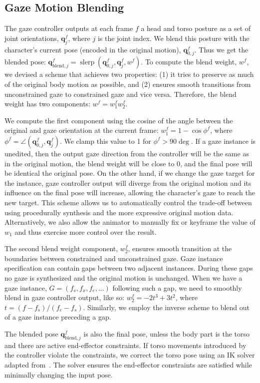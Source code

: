 \subsection{Gaze Motion Blending}
\label{sec:GazeMotionBlending}

The gaze controller outputs at each frame $f$ a head and torso posture as a set of joint orientations, $\mathbf{q}_j^f$, where $j$ is the joint index. We blend this posture with the character's current pose (encoded in the original motion), $\mathbf{q}_{0,j}^f$. Thus we get the blended pose: $\mathbf{q}_{\mathrm{blend},j}^f = \mathop{slerp}(\mathbf{q}_{0,j}^f, \mathbf{q}_j^f, w^f)$. To compute the blend weight, $w^f$, we devised a scheme that achieves two properties: (1) it tries to preserve as much of the original body motion as possible, and (2) ensures smooth transitions from unconstrained gaze to constrained gaze and vice versa. Therefore, the blend weight has two components: $w^f = w_1^f w_2^f$.

We compute the first component using the cosine of the angle between the original and gaze orientation at the current frame: $w_1^f = 1 - \cos \phi^f$, where $\phi^f = \angle(\mathbf{q}_{0,j}^f, \mathbf{q}_j^f)$. We clamp this value to 1 for $\phi^f > 90 \deg$. If a gaze instance is unedited, then the output gaze direction from the controller will be the same as in the original motion, the blend weight will be close to 0, and the final pose will be identical the original pose. On the other hand, if we change the gaze target for the instance, gaze controller output will diverge from the original motion and its influence on the final pose will increase, allowing the character's gaze to reach the new target. This scheme allows us to automatically control the trade-off between using procedurally synthesis and the more expressive original motion data. Alternatively, we also allow the animator to manually fix or keyframe the value of $w_1$ and thus exercise more control over the result.

The second blend weight component, $w_2^f$, ensures smooth transition at the boundaries between constrained and unconstrained gaze. Gaze instance specification can contain gaps between two adjacent instances. During these gaps no gaze is synthesized and the original motion is unchanged. When we have a gaze instance, $G = (f_s, f_x, f_e, \ldots)$ following such a gap, we need to smoothly blend in gaze controller output, like so: $w_2^f = -2 t^3 + 3 t^2$, where $t = (f - f_s)/(f_e - f_s)$. Similarly, we employ the inverse scheme to blend out of a gaze instance preceding a gap.

The blended pose $\mathbf{q}_{\mathrm{blend},j}^f$ is also the final pose, unless the body part is the torso and there are active end-effector constraints. If torso movements introduced by the controller violate the constraints, we correct the torso pose using an IK solver adapted from~\cite{shin2001puppetry}. The solver ensures the end-effector constraints are satisfied while minimally changing the input pose.